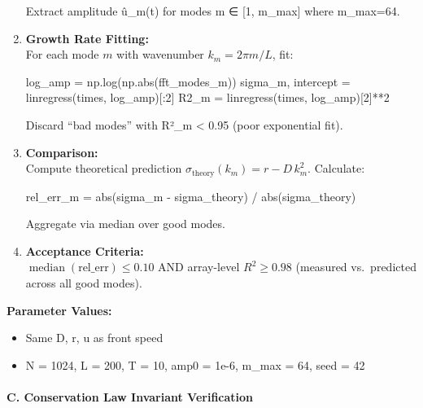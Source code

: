 \documentclass[
]{article}
\newenvironment{Shaded}{}{}
\newcommand{\BuiltInTok}[1]{\textcolor[rgb]{0.00,0.50,0.00}{#1}}
\newcommand{\DecValTok}[1]{\textcolor[rgb]{0.25,0.63,0.44}{#1}}
\newcommand{\NormalTok}[1]{#1}
\newcommand{\OperatorTok}[1]{\textcolor[rgb]{0.40,0.40,0.40}{#1}}
\providecommand{\tightlist}{%
  \setlength{\itemsep}{0pt}\setlength{\parskip}{0pt}}
\begin{document}
\begin{enumerate}
  Extract amplitude \textbar û\_m(t)\textbar{} for modes m ∈ {[}1,
  m\_max{]} where m\_max=64.
\item
  \textbf{Growth Rate Fitting:}\\
  For each mode \(m\) with wavenumber \(k_m = 2\pi m / L\), fit:

\begin{Shaded}
\begin{Highlighting}[]
\NormalTok{log\_amp }\OperatorTok{=}\NormalTok{ np.log(np.}\BuiltInTok{abs}\NormalTok{(fft\_modes\_m))}
\NormalTok{sigma\_m, intercept }\OperatorTok{=}\NormalTok{ linregress(times, log\_amp)[:}\DecValTok{2}\NormalTok{]}
\NormalTok{R2\_m }\OperatorTok{=}\NormalTok{ linregress(times, log\_amp)[}\DecValTok{2}\NormalTok{]}\OperatorTok{**}\DecValTok{2}
\end{Highlighting}
\end{Shaded}

  Discard ``bad modes'' with R²\_m \textless{} 0.95 (poor exponential
  fit).
\item
  \textbf{Comparison:}\\
  Compute theoretical prediction
  \(\sigma_{\text{theory}}(k_m) = r - D\,k_m^{2}\). Calculate:

\begin{Shaded}
\begin{Highlighting}[]
\NormalTok{rel\_err\_m }\OperatorTok{=} \BuiltInTok{abs}\NormalTok{(sigma\_m }\OperatorTok{{-}}\NormalTok{ sigma\_theory) }\OperatorTok{/} \BuiltInTok{abs}\NormalTok{(sigma\_theory)}
\end{Highlighting}
\end{Shaded}

  Aggregate via median over good modes.
\item
  \textbf{Acceptance Criteria:}\\
  \(\operatorname{median}(\mathrm{rel\_err}) \le 0.10\) AND array-level
  \(R^{2} \ge 0.98\) (measured vs.~predicted across all good modes).
\end{enumerate}

\textbf{Parameter Values:}

\begin{itemize}
\tightlist
\item
  Same D, r, u as front speed
\item
  N = 1024, L = 200, T = 10, amp0 = 1e-6, m\_max = 64, seed = 42
\end{itemize}

\hypertarget{c.-conservation-law-invariant-verification}{%
\paragraph{C. Conservation Law Invariant
Verification}\label{c.-conservation-law-invariant-verification}}
\end{document}

